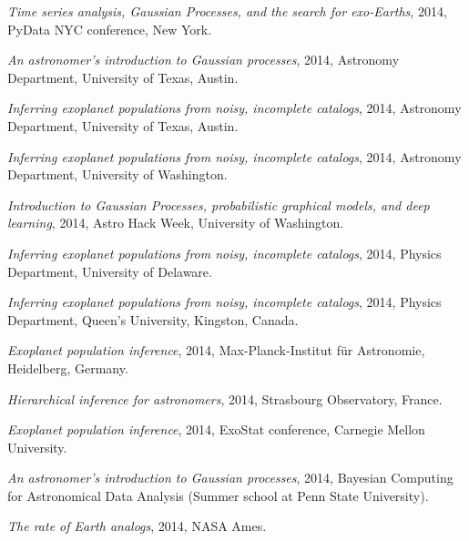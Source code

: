 \documentclass[12pt,letterpaper]{article}
\begin{document}
\begin{list}{}{\cvlist}
\item \emph{Time series analysis, Gaussian Processes, and the search for
            exo-Earths},
    2014, PyData NYC conference, New York.

\item \emph{An astronomer's introduction to Gaussian processes},
    2014, Astronomy Department, University of Texas, Austin.

\item \emph{Inferring exoplanet populations from noisy, incomplete catalogs},
    2014, Astronomy Department, University of Texas, Austin.

\item \emph{Inferring exoplanet populations from noisy, incomplete catalogs},
    2014, Astronomy Department, University of Washington.

\item \emph{Introduction to Gaussian Processes, probabilistic graphical
            models, and deep learning},
    2014, Astro Hack Week, University of Washington.

\item \emph{Inferring exoplanet populations from noisy, incomplete catalogs},
    2014, Physics Department, University of Delaware.

\item \emph{Inferring exoplanet populations from noisy, incomplete catalogs},
    2014, Physics Department, Queen's University, Kingston, Canada.

\item \emph{Exoplanet population inference},
    2014, Max-Planck-Institut f\"ur Astronomie, Heidelberg, Germany.

\item \emph{Hierarchical inference for astronomers},
    2014, Strasbourg Observatory, France.

\item \emph{Exoplanet population inference},
    2014, ExoStat conference, Carnegie Mellon University.

\item \emph{An astronomer's introduction to Gaussian processes},
    2014, Bayesian Computing for Astronomical Data Analysis (Summer school at
    Penn State University).

\item \emph{The rate of Earth analogs},
    2014, NASA Ames.


\end{list}
\end{document}
